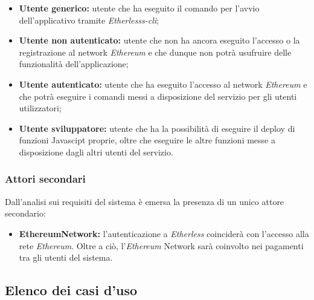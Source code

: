 \begin{itemize}
	\item \textbf{Utente generico:} utente che ha eseguito il comando per l'avvio dell'applicativo tramite \textit{Etherlesss-cli};
	\item \textbf{Utente non autenticato:} utente che non ha ancora eseguito l'accesso o la registrazione al network \textit{Ethereum\glo} e che dunque non potrà usufruire delle funzionalità dell'applicazione;
	\item \textbf{Utente autenticato:} utente che ha eseguito l'accesso al network \textit{Ethereum\glo} e che potrà eseguire i comandi messi a disposizione del servizio per gli utenti utilizzatori;
	\item \textbf{Utente sviluppatore:} utente che ha la possibilità di eseguire il deploy di funzioni Javascipt proprie, oltre che eseguire le altre funzioni messe a disposizione dagli altri utenti del servizio.
\end{itemize}


\subsubsection{Attori secondari}
Dall'analisi sui requisiti del sistema è emersa la presenza di un unico attore secondario:
\begin{itemize}
	\item \textbf{Ethereum\glo Network:} l'autenticazione a \textit{Etherless} coinciderà con l'accesso alla rete \textit{Ethereum\glos}. Oltre a ciò, l'\textit{Ethereum\glo} Network sarà coinvolto nei pagamenti tra gli utenti del sistema.
\end{itemize}


\subsection{Elenco dei casi d'uso}

